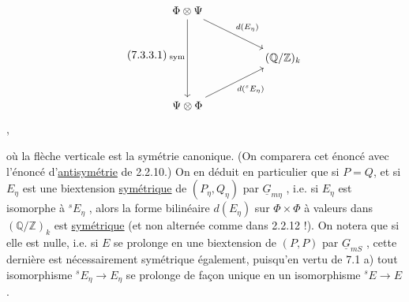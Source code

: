 \begin{equation}\tag{7.3.3.1}
\begin{tikzcd}[row sep=large, column sep=huge]
\Phi \otimes \Psi \arrow[dd, "\mathrm{sym}"'] \arrow[rd, "d(E_\eta)"] & \\
 & (\mathbb{Q}/\mathbb{Z})_k \\
\Psi \otimes \Phi \arrow[ru, "d({}^{s}E_\eta)"'] &
\end{tikzcd}
\end{equation}
,

où la flèche verticale est la symétrie canonique. (On comparera cet énoncé avec l'énoncé d'\underline{antisymétrie} de 2.2.10.) On en déduit en particulier que si $P=Q$, et si $E_\eta$ est une biextension \underline{symétrique} de $(P_\eta , Q_\eta)$ par $\underline{G}_{m\eta}$ , i.e. si $E_\eta$ est isomorphe à ${}^{s}E_\eta$ , alors la forme bilinéaire $d(E_\eta)$ sur $\Phi \times \Phi$ à valeurs dans $(\mathbb{Q}/\mathbb{Z})_k$ est \underline{symétrique} (et non alternée comme dans 2.2.12 !). On notera que si elle est nulle, i.e. si $E$ se prolonge en une biextension de $(P,P)$ par $\underline{G}_{mS}$ , cette dernière est nécessairement symétrique également, puisqu'en vertu de 7.1 a) tout isomorphisme ${}^{s}E_\eta \longrightarrow E_\eta$ se prolonge de façon unique en un isomorphisme ${}^{s}E \longrightarrow E$ .


